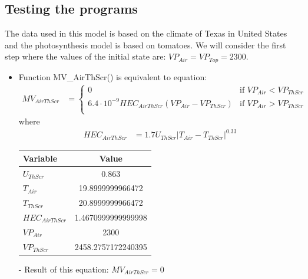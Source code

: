\documentclass[a4paper]{article}
\numberwithin{equation}{section}
\begin{document}
\subsection{Testing the programs}
The data used in this model is based on the climate of Texas in United States and the photosynthesis model is based on tomatoes.
We will consider the first step where the values of the initial state are: \(VP_{Air} = VP_{Top} = 2300\).
\begin{itemize}
  \item Function MV\_AirThScr() is equivalent to equation:
        \begin{align*}
          MV_{AirThScr} & = \begin{cases}
            0                                                       & \text{if~} VP_{Air} < VP_{ThScr} \\
            6.4 \cdot 10^{-9} HEC_{AirThScr}(VP_{Air} - VP_{ThScr}) & \text{if~} VP_{Air} > VP_{ThScr} \\
          \end{cases}
        \end{align*}
        where
        \begin{align*}
          HEC_{AirThScr} & = 1.7 U_{ThScr} |T_{Air} - T_{ThScr}|^{0.33}
        \end{align*}

        \begin{table}[H]
          \centering
          \begin{tabular}{@{}lS[table-format=4.17]@{}}
            \toprule
            \textbf{Variable}  & \textbf{Value}     \\
            \midrule
            \(U_{ThScr}\)      & 0.863              \\
            \(T_{Air}\)        & 19.8999999966472   \\
            \(T_{ThScr}\)      & 20.8999999966472   \\
            \(HEC_{AirThScr}\) & 1.4670999999999998 \\
            \(VP_{Air}\)       & 2300               \\
            \(VP_{ThScr}\)     & 2458.2757172240395 \\
            \bottomrule
          \end{tabular}
        \end{table}

  \item[-] Result of this equation: \(MV_{AirThScr} = 0\)


\end{itemize}
\end{document}
